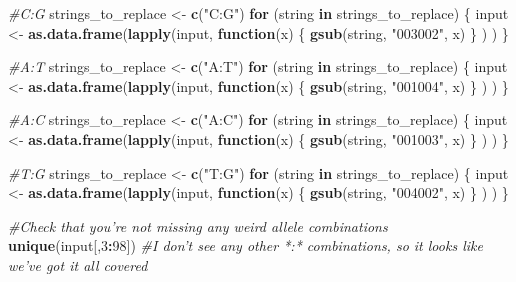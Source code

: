 \documentclass[
]{article}
\newenvironment{Shaded}{\begin{snugshade}}{\end{snugshade}}
\newcommand{\CommentTok}[1]{\textcolor[rgb]{0.56,0.35,0.01}{\textit{#1}}}
\newcommand{\ControlFlowTok}[1]{\textcolor[rgb]{0.13,0.29,0.53}{\textbf{#1}}}
\newcommand{\DecValTok}[1]{\textcolor[rgb]{0.00,0.00,0.81}{#1}}
\newcommand{\KeywordTok}[1]{\textcolor[rgb]{0.13,0.29,0.53}{\textbf{#1}}}
\newcommand{\NormalTok}[1]{#1}
\newcommand{\OperatorTok}[1]{\textcolor[rgb]{0.81,0.36,0.00}{\textbf{#1}}}
\newcommand{\StringTok}[1]{\textcolor[rgb]{0.31,0.60,0.02}{#1}}
\begin{document}
\begin{Shaded}
\begin{Highlighting}[]
\CommentTok{#C:G}
\NormalTok{strings_to_replace <-}\StringTok{ }\KeywordTok{c}\NormalTok{(}\StringTok{"C:G"}\NormalTok{)}
\ControlFlowTok{for}\NormalTok{ (string }\ControlFlowTok{in}\NormalTok{ strings_to_replace) \{ }
\NormalTok{  input <-}\StringTok{ }\KeywordTok{as.data.frame}\NormalTok{(}\KeywordTok{lapply}\NormalTok{(input, }\ControlFlowTok{function}\NormalTok{(x) \{ }
                                \KeywordTok{gsub}\NormalTok{(string, }\StringTok{"003002"}\NormalTok{, x)}
\NormalTok{                                \}}
\NormalTok{                              )}
\NormalTok{                        )}
\NormalTok{  \} }
  
\CommentTok{#A:T}
\NormalTok{strings_to_replace <-}\StringTok{ }\KeywordTok{c}\NormalTok{(}\StringTok{"A:T"}\NormalTok{)}
\ControlFlowTok{for}\NormalTok{ (string }\ControlFlowTok{in}\NormalTok{ strings_to_replace) \{ }
\NormalTok{  input <-}\StringTok{ }\KeywordTok{as.data.frame}\NormalTok{(}\KeywordTok{lapply}\NormalTok{(input, }\ControlFlowTok{function}\NormalTok{(x) \{ }
                                \KeywordTok{gsub}\NormalTok{(string, }\StringTok{"001004"}\NormalTok{, x)}
\NormalTok{                                \}}
\NormalTok{                              )}
\NormalTok{                        )}
\NormalTok{  \} }

\CommentTok{#A:C}
\NormalTok{strings_to_replace <-}\StringTok{ }\KeywordTok{c}\NormalTok{(}\StringTok{"A:C"}\NormalTok{)}
\ControlFlowTok{for}\NormalTok{ (string }\ControlFlowTok{in}\NormalTok{ strings_to_replace) \{ }
\NormalTok{  input <-}\StringTok{ }\KeywordTok{as.data.frame}\NormalTok{(}\KeywordTok{lapply}\NormalTok{(input, }\ControlFlowTok{function}\NormalTok{(x) \{ }
                                \KeywordTok{gsub}\NormalTok{(string, }\StringTok{"001003"}\NormalTok{, x)}
\NormalTok{                                \}}
\NormalTok{                              )}
\NormalTok{                        )}
\NormalTok{  \} }
  
\CommentTok{#T:G}
\NormalTok{strings_to_replace <-}\StringTok{ }\KeywordTok{c}\NormalTok{(}\StringTok{"T:G"}\NormalTok{)}
\ControlFlowTok{for}\NormalTok{ (string }\ControlFlowTok{in}\NormalTok{ strings_to_replace) \{ }
\NormalTok{  input <-}\StringTok{ }\KeywordTok{as.data.frame}\NormalTok{(}\KeywordTok{lapply}\NormalTok{(input, }\ControlFlowTok{function}\NormalTok{(x) \{ }
                                \KeywordTok{gsub}\NormalTok{(string, }\StringTok{"004002"}\NormalTok{, x)}
\NormalTok{                                \}}
\NormalTok{                              )}
\NormalTok{                        )}
\NormalTok{  \} }

\CommentTok{#Check that you're not missing any weird allele combinations}
\KeywordTok{unique}\NormalTok{(input[,}\DecValTok{3}\OperatorTok{:}\DecValTok{98}\NormalTok{]) }\CommentTok{#I don't see any other *:* combinations, so it looks like we've got it all covered}
\end{Highlighting}
\end{Shaded}
\end{document}
